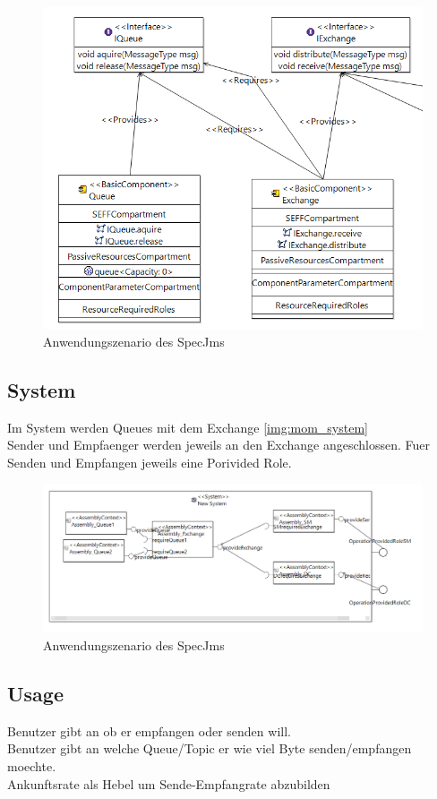 \begin{figure}
\center
  \includegraphics[width=1\textwidth]{images/mom_repository.png}
  \caption{Anwendungszenario des SpecJms}
  \label{img:mom_repository}
\end{figure}

\subsection{System}
Im System werden Queues mit dem Exchange \autoref{img:mom_system}\\
Sender und Empfaenger werden jeweils an den Exchange angeschlossen. Fuer Senden und Empfangen jeweils eine Porivided Role.

\begin{figure}
\center
  \includegraphics[width=1\textwidth]{images/mom_system.png}
  \caption{Anwendungszenario des SpecJms}
  \label{img:mom_system}
\end{figure}

\subsection{Usage}
Benutzer gibt an ob er empfangen oder senden will. \\
Benutzer gibt an welche Queue/Topic er wie viel Byte senden/empfangen moechte. \\
Ankunftsrate als Hebel um Sende-Empfangrate abzubilden \\
